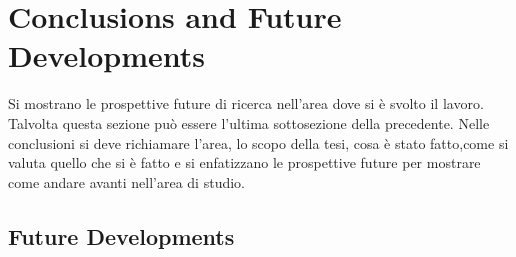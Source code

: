 \chapter{Conclusions and Future Developments}
\label{ch7_concl}
\thispagestyle{empty}

\vspace{0.5cm}

\noindent Si mostrano le prospettive future di ricerca nell'area dove si \`e 
svolto il lavoro. Talvolta questa sezione pu\`o essere l'ultima sottosezione 
della precedente. Nelle conclusioni si deve richiamare l'area, lo scopo della 
tesi, cosa \`e stato fatto,come si valuta quello che si \`e fatto e si 
enfatizzano le prospettive future per mostrare come andare avanti nell'area di 
studio.

\section{Future Developments}
